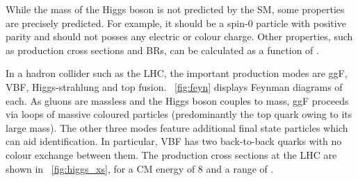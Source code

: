 
While the mass of the Higgs boson is not predicted by the \ac{SM}, some properties are 
precisely predicted. For example, it should be a spin-0 particle with positive parity and
should not posses any electric or colour charge. Other properties, such as production
cross sections and \acp{BR}, can be calculated as a function of \mH.


In a hadron collider such as the \ac{LHC}, the important production modes are \ac{ggF},
\ac{VBF}, Higgs-strahlung and top fusion. \Figure~\ref{fig:feyn} displays Feynman diagrams 
of each. As gluons are massless and the Higgs boson couples to mass, \ac{ggF} proceeds via 
loops of massive coloured particles (predominantly the top quark owing to its large mass). 
The other three modes feature additional final state particles which can aid 
identification. In particular, \ac{VBF} has two back-to-back quarks with no colour 
exchange between them. The production cross sections at the \ac{LHC} are shown in
\Figure~\ref{fig:higgs_xs}, for a \ac{CM} energy of \unit{8}{\TeV} and a range of \mH.

